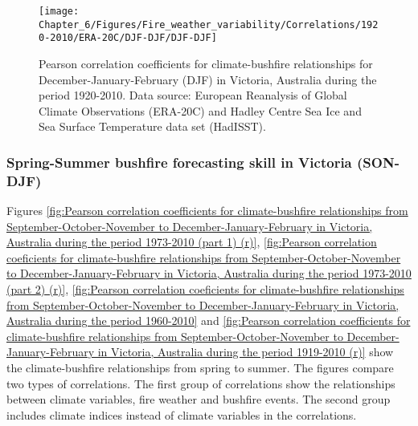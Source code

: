 \begin{figure}[h]
\noindent \begin{centering}
\texttt{[image: Chapter\_6/Figures/Fire\_weather\_variability/Correlations/1920-2010/ERA-20C/DJF-DJF/DJF-DJF]}
\par\end{centering}

\caption[Pearson correlation coefficients for climate-bushfire relationships
for December-January-February (DJF) in Victoria, Australia during
the period 1920-2010]{Pearson correlation coefficients for climate-bushfire relationships
for December-January-February (DJF) in Victoria, Australia during
the period 1920-2010. Data source: European Reanalysis of Global Climate
Observations (ERA-20C) and Hadley Centre Sea Ice and Sea Surface Temperature
data set (HadISST). \label{fig:Pearson correlation coefficients for climate-bushfire relationships for December-January-February in Victoria, Australia during the period 1920-2010 (r)}}
\end{figure}



\subsubsection{Spring-Summer bushfire forecasting skill in Victoria (SON-DJF)}

Figures \ref{fig:Pearson correlation coefficients for climate-bushfire relationships from September-October-November to December-January-February in Victoria, Australia during the period 1973-2010 (part 1) (r)},
\ref{fig:Pearson correlation coeficients for climate-bushfire relationships from September-October-November to December-January-February in Victoria, Australia during the period 1973-2010 (part 2) (r)},
\ref{fig:Pearson correlation coeficients for climate-bushfire relationships from September-October-November to December-January-February in Victoria, Australia during the period 1960-2010}
and \ref{fig:Pearson correlation coefficients for climate-bushfire relationships from September-October-November to December-January-February in Victoria, Australia during the period 1919-2010 (r)}
show the climate-bushfire relationships from spring to summer. The
figures compare two types of correlations. The first group of correlations
show the relationships between climate variables, fire weather and
bushfire events. The second group includes climate indices instead
of climate variables in the correlations.

